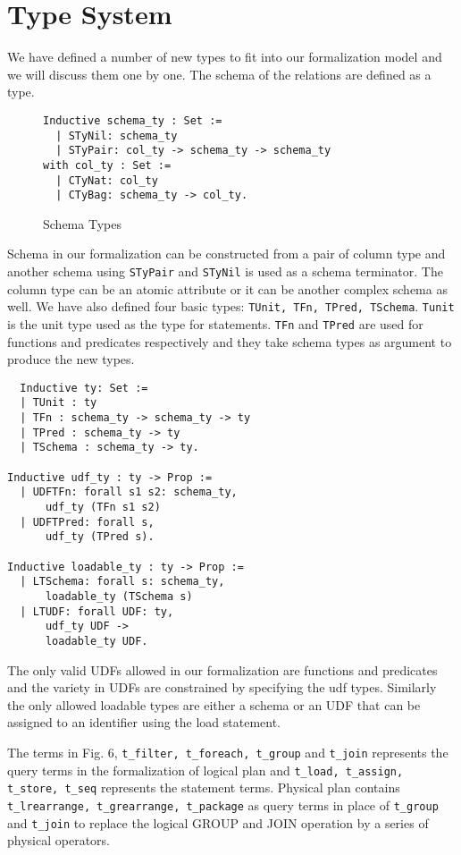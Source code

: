 \section{Type System}
\label{sec:types}

We have defined a number of new types to fit into our formalization model and we will discuss them one by one. The schema of the relations are defined as a type.

\begin{figure}
\begin{lstlisting}
Inductive schema_ty : Set :=
  | STyNil: schema_ty
  | STyPair: col_ty -> schema_ty -> schema_ty
with col_ty : Set :=
  | CTyNat: col_ty
  | CTyBag: schema_ty -> col_ty.
\end{lstlisting}
\caption{Schema Types}
\label{fig-schema_types}
\end{figure}

Schema in our formalization can be constructed from a pair of column type and another schema using \texttt{STyPair} and \texttt{STyNil} is used as a schema terminator. The column type can be an atomic attribute or it can be another complex schema as well. We have also defined four basic types: \texttt{TUnit, TFn, TPred, TSchema}. \texttt{Tunit} is the unit type used as the type for statements. \texttt{TFn} and \texttt{TPred} are used for functions and predicates respectively and they take schema types as argument to produce the new types.

\begin{lstlisting}
  Inductive ty: Set :=
  | TUnit : ty
  | TFn : schema_ty -> schema_ty -> ty
  | TPred : schema_ty -> ty
  | TSchema : schema_ty -> ty.

Inductive udf_ty : ty -> Prop :=
  | UDFTFn: forall s1 s2: schema_ty,
      udf_ty (TFn s1 s2)
  | UDFTPred: forall s,
      udf_ty (TPred s).

Inductive loadable_ty : ty -> Prop :=
  | LTSchema: forall s: schema_ty,
      loadable_ty (TSchema s)
  | LTUDF: forall UDF: ty,
      udf_ty UDF ->
      loadable_ty UDF.
\end{lstlisting}

The only valid UDFs allowed in our formalization are functions and predicates and the variety in UDFs are constrained by specifying the udf types. Similarly the only allowed loadable types are either a schema or an UDF that can be assigned to an identifier using the load statement.


The terms in Fig. 6, \texttt{t\_filter, t\_foreach, t\_group} and \texttt{t\_join} represents the query terms in the formalization of logical plan and \texttt{t\_load, t\_assign, t\_store, t\_seq} represents the statement terms. Physical plan contains \texttt{t\_lrearrange, t\_grearrange, t\_package} as query terms in place of \texttt{t\_group} and \texttt{t\_join} to replace the logical GROUP and JOIN operation by a series of physical operators.


